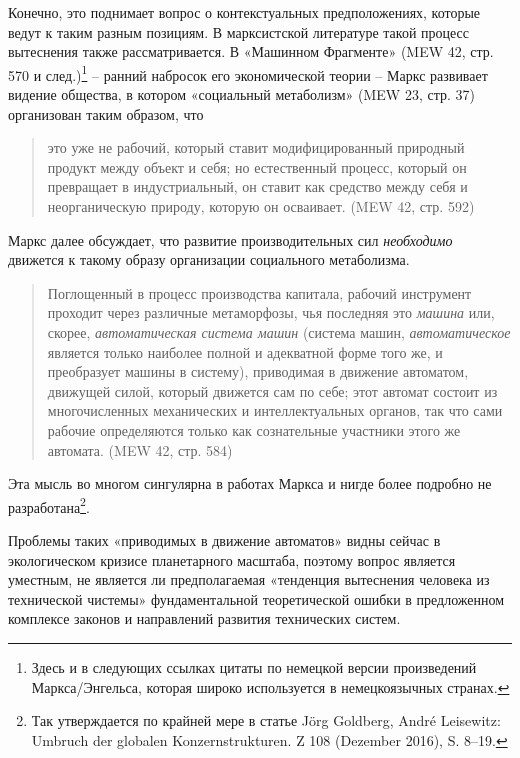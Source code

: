 \documentclass[11pt,a4paper]{article}
\begin{document}
Конечно, это поднимает вопрос о контекстуальных предположениях, которые ведут
к таким разным позициям. В марксистской литературе такой процесс вытеснения
также рассматривается. В «Машинном Фрагменте» (MEW 42, стр. 570 и
след.)\footnote{Здесь и в следующих ссылках цитаты по немецкой версии
  произведений Маркса/Энгельса, которая широко используется в немецкоязычных
  странах.} -- ранний набросок его экономической теории -- Маркс развивает
видение общества, в котором «социальный метаболизм» (MEW 23, стр. 37)
организован таким образом, что
\begin{quote}
  это уже не рабочий, который ставит модифицированный природный продукт между
  объект и себя; но естественный процесс, который он превращает в
  индустриальный, он ставит как средство между себя и неорганическую природу,
  которую он осваивает. (MEW 42, стр. 592)
\end{quote}
Маркс далее обсуждает, что развитие производительных сил \emph{необходимо}
движется к такому образу организации социального метаболизма.
\begin{quote}
  Поглощенный в процесс производства капитала, рабочий инструмент проходит
  через различные метаморфозы, чья последняя это \emph{машина} или, скорее,
  \emph{автоматическая система машин} (система машин, \emph{автоматическое}
  является только наиболее полной и адекватной форме того же, и преобразует
  машины в систему), приводимая в движение автоматом, движущей силой, который
  движется сам по себе; этот автомат состоит из многочисленных механических и
  интеллектуальных органов, так что сами рабочие определяются только как
  сознательные участники этого же автомата. (MEW 42, стр. 584)
\end{quote}
Эта мысль во многом сингулярна в работах Маркса и нигде более подробно не
разработана\footnote{Так утверждается по крайней мере в статье Jörg Goldberg,
  André Leisewitz: Umbruch der globalen Konzernstrukturen. Z 108 (Dezember
  2016), S. 8--19.}.

Проблемы таких «приводимых в движение автоматов» видны сейчас в экологическом
кризисе планетарного масштаба, поэтому вопрос является уместным, не является
ли предполагаемая «тенденция вытеснения человека из технической чистемы»
фундаментальной теоретической ошибки в предложенном комплексе законов и
направлений развития технических систем.
\end{document}
